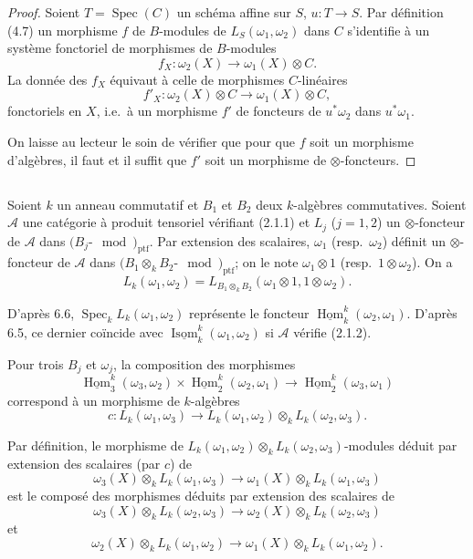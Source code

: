 \documentclass[12pt,a4paper]{article}
\theoremstyle{plain}
\theoremstyle{definition}
\DeclareMathOperator{\Spec}{Spec}
\DeclareMathOperator{\Hom}{Hom}
\DeclareMathOperator{\Isom}{Isom}
\DeclareMathOperator{\ptf}{ptf}
\begin{document}
\begin{proof}
Soient $T = \Spec(C)$ un schéma affine sur $S$, $u : T \to S$. Par définition (4.7) un morphisme $f$ de $B$-modules de $L_S(\omega_1, \omega_2)$ dans $C$ s'identifie à un système fonctoriel de morphismes de $B$-modules
\[
f_X : \omega_2(X) \to \omega_1(X) \otimes C.
\]
La donnée des $f_X$ équivaut à celle de morphismes $C$-linéaires
\[
f'_X : \omega_2(X) \otimes C \to \omega_1(X) \otimes C,
\]
fonctoriels en $X$, i.e.~à un morphisme $f'$ de foncteurs de $u^*\omega_2$ dans $u^*\omega_1$.

On laisse au lecteur le soin de vérifier que pour que $f$ soit un morphisme d'algèbres, il faut et il suffit que $f'$ soit un morphisme de $\otimes$-foncteurs.
\end{proof}

\subsection{}

Soient $k$ un anneau commutatif et $B_1$ et $B_2$ deux $k$-algèbres commutatives. Soient $\mathcal{A}$ une catégorie à produit tensoriel vérifiant (2.1.1) et $L_j$ ($j=1,2$) un $\otimes$-foncteur de $\mathcal{A}$ dans $(B_j\text{-}\mod)_{\ptf}$. Par extension des scalaires, $\omega_1$ (resp.~$\omega_2$) définit un $\otimes$-foncteur de $\mathcal{A}$ dans $(B_1 \otimes_k B_2\text{-}\mod)_{\ptf}$; on le note $\omega_1 \otimes 1$ (resp.~$1 \otimes \omega_2$). On a
\[
L_k(\omega_1, \omega_2) = L_{B_1 \otimes_k B_2}(\omega_1 \otimes 1, 1 \otimes \omega_2).
\]

D'après 6.6, $\Spec_k L_k(\omega_1, \omega_2)$ représente le foncteur $\underline{\Hom}^k_k(\omega_2, \omega_1)$. D'après 6.5, ce dernier coïncide avec $\underline{\Isom}^k_k(\omega_1, \omega_2)$ si $\mathcal{A}$ vérifie (2.1.2).

Pour trois $B_j$ et $\omega_j$, la composition des morphismes
\[
\underline{\Hom}^k_3(\omega_3, \omega_2) \times \underline{\Hom}^k_2(\omega_2, \omega_1) \to \underline{\Hom}^k_2(\omega_3, \omega_1)
\]
correspond à un morphisme de $k$-algèbres
\[
c : L_k(\omega_1, \omega_3) \to L_k(\omega_1, \omega_2) \otimes_k L_k(\omega_2, \omega_3).
\]

Par définition, le morphisme de $L_k(\omega_1, \omega_2) \otimes_k L_k(\omega_2, \omega_3)$-modules déduit par extension des scalaires (par $c$) de
\[
\omega_3(X) \otimes_k L_k(\omega_1, \omega_3) \to \omega_1(X) \otimes_k L_k(\omega_1, \omega_3)
\]
est le composé des morphismes déduits par extension des scalaires de
\[
\omega_3(X) \otimes_k L_k(\omega_2, \omega_3) \to \omega_2(X) \otimes_k L_k(\omega_2, \omega_3)
\]
et
\[
\omega_2(X) \otimes_k L_k(\omega_1, \omega_2) \to \omega_1(X) \otimes_k L_k(\omega_1, \omega_2).
\]
\end{document}
